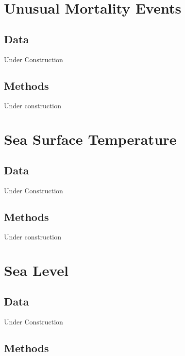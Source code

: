\documentclass[
]{book}
\begin{document}
\hypertarget{unusual-mortality-events}{%
\chapter{Unusual Mortality Events}\label{unusual-mortality-events}}

\hypertarget{data-8}{%
\section{Data}\label{data-8}}

Under Construction

\hypertarget{methods-8}{%
\section{Methods}\label{methods-8}}

Under construction

\hypertarget{sea-surface-temperature}{%
\chapter{Sea Surface Temperature}\label{sea-surface-temperature}}

\hypertarget{data-9}{%
\section{Data}\label{data-9}}

Under Construction

\hypertarget{methods-9}{%
\section{Methods}\label{methods-9}}

Under construction

\hypertarget{sea-level}{%
\chapter{Sea Level}\label{sea-level}}

\hypertarget{data-10}{%
\section{Data}\label{data-10}}

Under Construction

\hypertarget{methods-10}{%
\section{Methods}\label{methods-10}}
\end{document}
